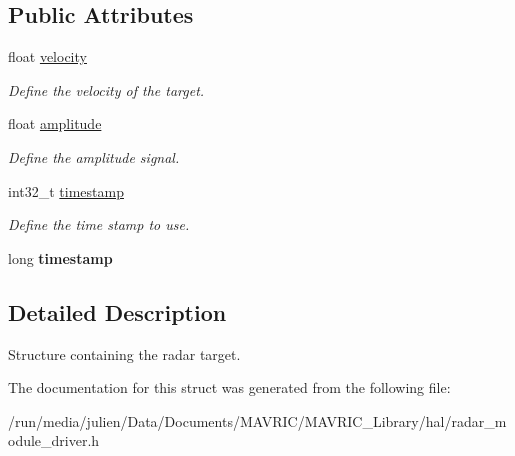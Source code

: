 \subsection*{Public Attributes}
\begin{DoxyCompactItemize}
\item 
\hypertarget{structradar__target__t_a7140adf97a2144ef253297942a973527}{float \hyperlink{structradar__target__t_a7140adf97a2144ef253297942a973527}{velocity}}\label{structradar__target__t_a7140adf97a2144ef253297942a973527}

\begin{DoxyCompactList}\small\item\em Define the velocity of the target. \end{DoxyCompactList}\item 
\hypertarget{structradar__target__t_a8be80bf889d266bd0c8abfa411e11114}{float \hyperlink{structradar__target__t_a8be80bf889d266bd0c8abfa411e11114}{amplitude}}\label{structradar__target__t_a8be80bf889d266bd0c8abfa411e11114}

\begin{DoxyCompactList}\small\item\em Define the amplitude signal. \end{DoxyCompactList}\item 
\hypertarget{structradar__target__t_afb7d0ba933e108a1dc41f2e13a725e76}{int32\+\_\+t \hyperlink{structradar__target__t_afb7d0ba933e108a1dc41f2e13a725e76}{timestamp}}\label{structradar__target__t_afb7d0ba933e108a1dc41f2e13a725e76}

\begin{DoxyCompactList}\small\item\em Define the time stamp to use. \end{DoxyCompactList}\item 
\hypertarget{structradar__target__t_a7c7ba74e4bf37177698dab17dd7ac380}{long {\bfseries timestamp}}\label{structradar__target__t_a7c7ba74e4bf37177698dab17dd7ac380}

\end{DoxyCompactItemize}


\subsection{Detailed Description}
Structure containing the radar target. 

The documentation for this struct was generated from the following file\+:\begin{DoxyCompactItemize}
\item 
/run/media/julien/\+Data/\+Documents/\+M\+A\+V\+R\+I\+C/\+M\+A\+V\+R\+I\+C\+\_\+\+Library/hal/radar\+\_\+module\+\_\+driver.\+h\end{DoxyCompactItemize}
